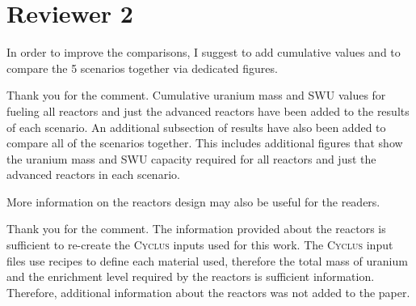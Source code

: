 \documentclass[answers,11pt]{exam}
\newcommand{\Cyclus}{\textsc{Cyclus}\xspace}%
\begin{document}
\section*{Reviewer 2}
\begin{questions}
        \question In order to improve the comparisons, I suggest to add 
        cumulative values and to compare the 5 scenarios together via dedicated 
        figures.
        \begin{solution}
                Thank you for the comment. Cumulative uranium mass and \gls{SWU} values
                for fueling all reactors and just the advanced reactors 
                have been added to the results of each scenario. An additional 
                subsection of results have also been added to compare all of the 
                scenarios together. This includes additional figures that show the 
                uranium mass and SWU capacity required for all reactors and just the 
                advanced reactors in each scenario. 
        \end{solution}

        \question More information on the reactors design may also be useful 
        for the readers.
        \begin{solution}
                Thank you for the comment. The information provided about the reactors 
                is sufficient to re-create the \Cyclus inputs used for this work.
                The \Cyclus input files use recipes to define each material used, 
                therefore the total mass of uranium and the enrichment level 
                required by the reactors is sufficient information. Therefore, 
                additional information about the reactors was not added to the 
                paper. 
        \end{solution}


\end{questions}
\end{document}
